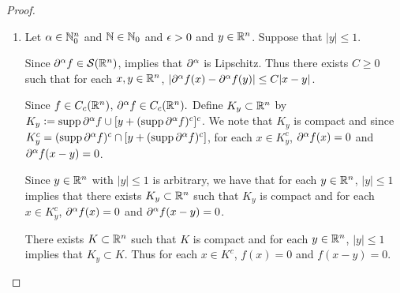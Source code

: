 \documentclass{book}
\begin{document}
	\begin{proof}\
		\begin{enumerate}
			\item Let $\alpha \in \mathbb{N}_0^n$ and $\mathbb{N} \in \mathbb{N}_0$ and $\epsilon > 0$ and $y \in \mathbb{R}^n$. Suppose that $|y| \leq 1$. 
			
			
			Since $\partial^{\alpha} f \in \mathcal{S}(\mathbb{R}^n)$,  implies that $\partial^{\alpha}$ is Lipschitz. Thus there exists $C \geq 0$ such that for each $x,y \in \mathbb{R}^n$, $|\partial^{\alpha}f(x) - \partial^{\alpha}f(y)| \leq C|x-y|$.
			
			Since $f \in C_c(\mathbb{R}^n)$, $\partial^{\alpha}f \in C_c(\mathbb{R}^n).$ Define $K_y \subset \mathbb{R}^n$ by $K_y \vcentcolon= \operatorname{supp} \partial^{\alpha}f \cup [y + (\operatorname{supp} \partial^{\alpha}f)^c]^c$. We note that $K_y$ is compact and since $K_y^c = (\operatorname{supp} \partial^{\alpha}f)^c \cap [y + (\operatorname{supp} \partial^{\alpha}f)^c]$, for each $x \in K_y^c$, $\partial^{\alpha}f(x) = 0$ and $\partial^{\alpha}f(x-y) = 0$. 
			
			Since $y \in \mathbb{R}^n$ with $|y| \leq 1$ is arbitrary, we have that for each $y \in \mathbb{R}^n$, $|y| \leq 1$ implies that there exists $K_y \subset \mathbb{R}^n$ such that $K_y$ is compact and for each $x \in K_y^c$, $\partial^{\alpha}f(x) = 0$ and $\partial^{\alpha}f(x-y) = 0$. 
			
			There exists $K \subset \mathbb{R}^n$ such that $K$ is compact and for each $y \in \mathbb{R}^n$, $|y| \leq 1$ implies that $K_y \subset K$. Thus for each $x \in K^c$, $f(x) = 0$ and $f(x-y) = 0$. 
			

\end{enumerate}
\end{proof}
\end{document}
